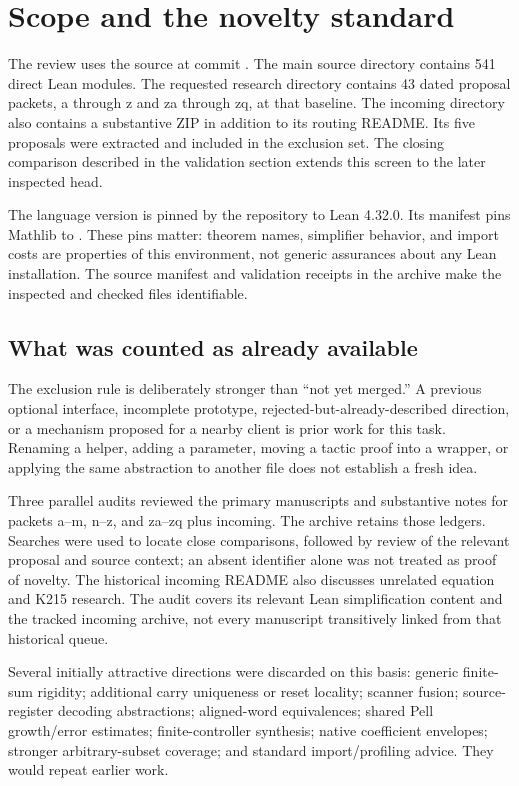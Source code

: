 \section{Scope and the novelty standard}
\label{sec:scope}
The review uses the source at commit . The main source directory contains 541 direct Lean modules. The requested research directory contains 43 dated proposal packets, a through z and za through zq, at that baseline. The incoming directory also contains a substantive ZIP in addition to its routing README. Its five proposals were extracted and included in the exclusion set. The closing comparison described in the validation section extends this screen to the later inspected head.

The language version is pinned by the repository to Lean 4.32.0. Its manifest pins Mathlib to . These pins matter: theorem names, simplifier behavior, and import costs are properties of this environment, not generic assurances about any Lean installation. The source manifest and validation receipts in the archive make the inspected and checked files identifiable.

\subsection{What was counted as already available}
The exclusion rule is deliberately stronger than ``not yet merged.'' A previous optional interface, incomplete prototype, rejected-but-already-described direction, or a mechanism proposed for a nearby client is prior work for this task. Renaming a helper, adding a parameter, moving a tactic proof into a wrapper, or applying the same abstraction to another file does not establish a fresh idea.

Three parallel audits reviewed the primary manuscripts and substantive notes for packets a--m, n--z, and za--zq plus incoming. The archive retains those ledgers. Searches were used to locate close comparisons, followed by review of the relevant proposal and source context; an absent identifier alone was not treated as proof of novelty. The historical incoming README also discusses unrelated equation and K215 research. The audit covers its relevant Lean simplification content and the tracked incoming archive, not every manuscript transitively linked from that historical queue.

Several initially attractive directions were discarded on this basis: generic finite-sum rigidity; additional carry uniqueness or reset locality; scanner fusion; source-register decoding abstractions; aligned-word equivalences; shared Pell growth/error estimates; finite-controller synthesis; native coefficient envelopes; stronger arbitrary-subset coverage; and standard import/profiling advice. They would repeat earlier work.

